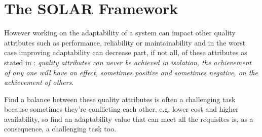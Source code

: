 \section{The SOLAR Framework}
However working on the adaptability of a system can impact other quality attributes such as performance, reliability or maintainability and in the worst case improving adaptability can decrease part, if not all, of these attributes as stated in \cite{bass2003software}: \emph{quality attributes can never be achieved in isolation, the achievement of any one will have an effect, sometimes positive and sometimes negative, on the achievement of others}.

Find a balance between these quality attributes is often a challenging task because sometimes they're conflicting each other, e.g. lower cost and higher availability, so find an adaptability value that can meet all the requisites is, as a consequence, a challenging task too.




